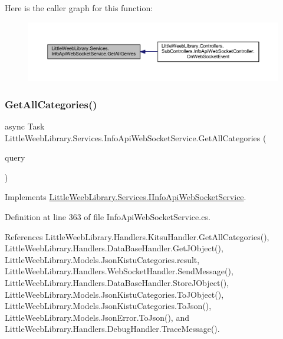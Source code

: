 Here is the caller graph for this function\+:\nopagebreak
\begin{figure}[H]
\begin{center}
\leavevmode
\includegraphics[width=350pt]{class_little_weeb_library_1_1_services_1_1_info_api_web_socket_service_a2882975741be27c69b461509d48e2636_icgraph}
\end{center}
\end{figure}
\mbox{\label{class_little_weeb_library_1_1_services_1_1_info_api_web_socket_service_a310f91aba5d17d8202aea81442da2545}} 
\subsubsection{\texorpdfstring{Get\+All\+Categories()}{GetAllCategories()}}
{\footnotesize\ttfamily async Task Little\+Weeb\+Library.\+Services.\+Info\+Api\+Web\+Socket\+Service.\+Get\+All\+Categories (\begin{DoxyParamCaption}\item[{J\+Object}]{query }\end{DoxyParamCaption})}



Implements \mbox{\hyperlink{interface_little_weeb_library_1_1_services_1_1_i_info_api_web_socket_service_a9c96d562783b36df84843e6dfe36d049}{Little\+Weeb\+Library.\+Services.\+I\+Info\+Api\+Web\+Socket\+Service}}.



Definition at line 363 of file Info\+Api\+Web\+Socket\+Service.\+cs.



References Little\+Weeb\+Library.\+Handlers.\+Kitsu\+Handler.\+Get\+All\+Categories(), Little\+Weeb\+Library.\+Handlers.\+Data\+Base\+Handler.\+Get\+J\+Object(), Little\+Weeb\+Library.\+Models.\+Json\+Kistu\+Categories.\+result, Little\+Weeb\+Library.\+Handlers.\+Web\+Socket\+Handler.\+Send\+Message(), Little\+Weeb\+Library.\+Handlers.\+Data\+Base\+Handler.\+Store\+J\+Object(), Little\+Weeb\+Library.\+Models.\+Json\+Kistu\+Categories.\+To\+J\+Object(), Little\+Weeb\+Library.\+Models.\+Json\+Kistu\+Categories.\+To\+Json(), Little\+Weeb\+Library.\+Models.\+Json\+Error.\+To\+Json(), and Little\+Weeb\+Library.\+Handlers.\+Debug\+Handler.\+Trace\+Message().



